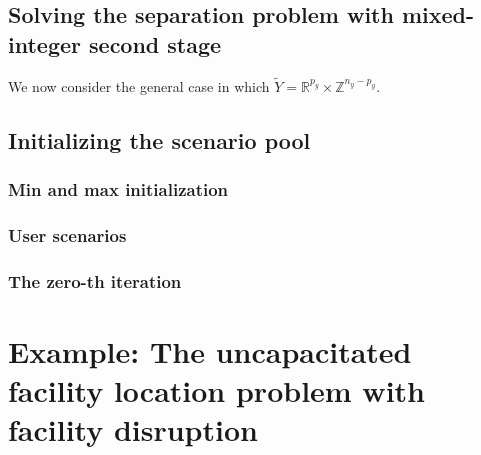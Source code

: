 \subsection{Solving the separation problem with mixed-integer second stage}

We now consider the general case in which $\tilde{Y} =
\mathbb{R}^{p_y}\times\mathbb{Z}^{n_y - p_y}$. 


\subsection{Initializing the scenario pool}
\label{sec:ccg:initial-scenario}

\subsubsection{Min and max initialization}


\subsubsection{User scenarios}


\subsubsection{The zero-th iteration}


\section[Example: The UFLP with facility disruption]{Example: The uncapacitated facility location problem with facility disruption}

